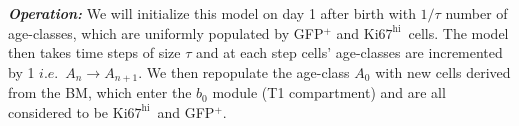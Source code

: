 \documentclass[11pt]{article}
\newcommand{\khi}{\ensuremath{\text{Ki67}^\text{hi}}~}
\newcommand\ie{$\textit{i.e.}$}
\begin{document}
\textbf{\textit{Operation:}}
We will initialize this model on day 1 after birth with $1/{\tau}$ number of age-classes, which are uniformly populated by GFP$^{+}$ and \khi cells. %
The model then takes time steps of size $\tau$ and at each step cells' age-classes are incremented by 1 {\ie}~$A_n \rightarrow A_{n+1}$.
We then repopulate the age-class $A_0$ with new cells derived from the BM, which enter the $b_0$ module (T1 compartment) and are all considered to be \khi and GFP$^{+}$.

\end{document}
